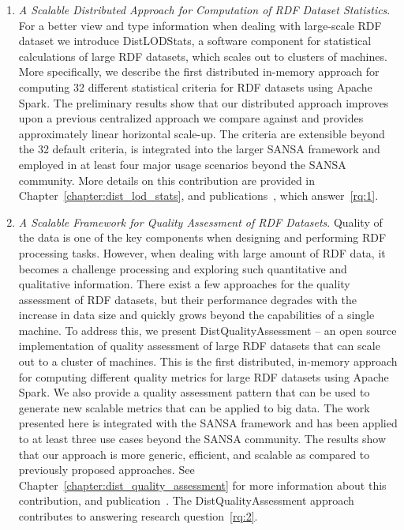 \begin{enumerate}
    \item \textit{A Scalable Distributed Approach for Computation of RDF Dataset Statistics}.
    For a better view and type information when dealing with large-scale RDF dataset we introduce DistLODStats, a software component for statistical calculations of large RDF datasets, which scales out to clusters of machines.
    More specifically, we describe the first distributed in-memory approach for computing 32 different statistical criteria for \gls{RDF} datasets using Apache Spark.
    The preliminary results show that our distributed approach improves upon a previous centralized approach we compare against and provides approximately linear horizontal scale-up.
    The criteria are extensible beyond the 32 default criteria, is integrated into the larger SANSA framework and employed in at least four major usage scenarios beyond the SANSA community.
    More details on this contribution are provided in Chapter~\ref{chapter:dist_lod_stats}, and publications~\cite{sejdiu-2018-dist-lod-stats-iswc, sejdiu-2018-statisfy-iswc-poster}, which answer~\ref{rq:1}.
    
    \item \textit{A Scalable Framework for Quality Assessment of RDF Datasets}.
    Quality of the data is one of the key components when designing and performing RDF processing tasks.
    However, when dealing with large amount of RDF data, it becomes a challenge processing and exploring such quantitative and qualitative information.
    There exist a few approaches for the quality assessment of RDF datasets, but their performance degrades with the increase in data size and quickly grows beyond the capabilities of a single machine. 
    To address this, we present DistQualityAssessment -- an open source implementation of quality assessment of large RDF datasets that can scale out to a cluster of machines.
    This is the first distributed, in-memory approach for computing different quality metrics for large \gls{RDF} datasets using Apache Spark. We also provide a quality assessment pattern that can be used to generate new scalable metrics that can be applied to big data.
    The work presented here is integrated with the SANSA framework and has been applied to at least three use cases beyond the SANSA community.   
    The results show that our approach is more generic, efficient, and scalable as compared to previously proposed approaches.
    See Chapter~\ref{chapter:dist_quality_assessment} for more information about this contribution, and publication~\cite{sejdiu-2019-sansa-dist-quality-assessment-iswc}.
    The DistQualityAssessment approach contributes to answering research question~\ref{rq:2}.
    

\end{enumerate}
